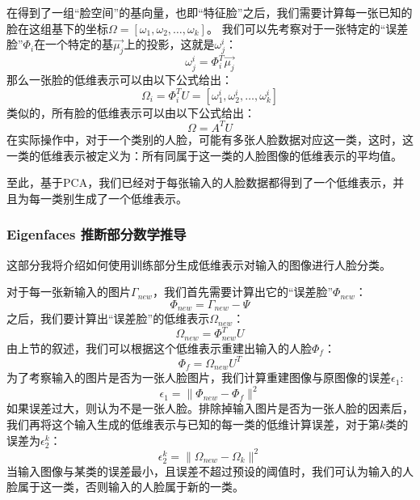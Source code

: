 \documentclass{ctexart}
\begin{document}
\noindent
在得到了一组“脸空间”的基向量，也即“特征脸”之后，我们需要计算每一张已知的脸在这组基下的坐标$\Omega=[\omega_1, \omega_2, \dots, \omega_k]$。
我们可以先考察对于一张特定的“误差脸”$\Phi_i$在一个特定的基$\vec{\mu_j}$上的投影，这就是$\omega^i_j$：
$$
    \omega^i_j = \Phi_i^T \vec{\mu_j}
$$
那么一张脸的低维表示可以由以下公式给出：
$$
    \Omega_i = \Phi_i^T U = [\omega_1^i, \omega_2^i, \dots, \omega_k^i]
$$
类似的，所有脸的低维表示可以由以下公式给出：
$$
    \Omega = A^T U
$$
在实际操作中，对于一个类别的人脸，可能有多张人脸数据对应这一类，这时，这一类的低维表示被定义为：所有同属于这一类的人脸图像的低维表示的平均值。

至此，基于PCA，我们已经对于每张输入的人脸数据都得到了一个低维表示，并且为每一类别生成了一个低维表示。
\subsubsection{Eigenfaces 推断部分数学推导}

这部分我将介绍如何使用训练部分生成低维表示对输入的图像进行人脸分类。

\noindent
对于每一张新输入的图片$\Gamma_{new}$，我们首先需要计算出它的“误差脸”$\Phi_{new}$：
$$
    \Phi_{new} = \Gamma_{new} - \Psi
$$
之后，我们要计算出“误差脸”的低维表示$\Omega_{new}$：
$$
    \Omega_{new} = \Phi_{new}^TU
$$
由上节的叙述，我们可以根据这个低维表示重建出输入的人脸$\Phi_{f}$：
$$
    \Phi_f = \Omega_{new}U^T
$$
为了考察输入的图片是否为一张人脸图片，我们计算重建图像与原图像的误差$\epsilon_1$:
$$
    \epsilon_1 = \|\Phi_{new}-\Phi_f\|^2
$$
如果误差过大，则认为不是一张人脸。排除掉输入图片是否为一张人脸的因素后，我们再将这个输入生成的低维表示与已知的每一类的低维计算误差，对于第$k$类的误差为$\epsilon^k_2$：
$$
    \epsilon^k_2 = \| \Omega_{new} - \Omega_k \|^2
$$
当输入图像与某类的误差最小，且误差不超过预设的阈值时，我们可认为输入的人脸属于这一类，否则输入的人脸属于新的一类。
\end{document}
